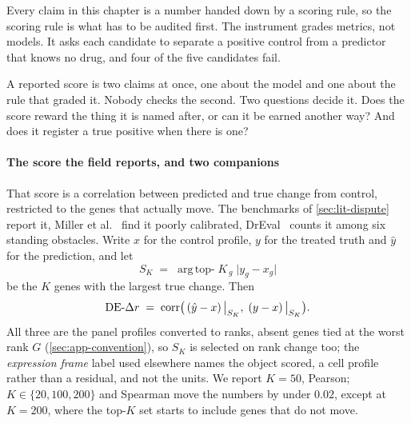 
\label{sec:methods-metrics}   %


\begin{question}[1]
Every claim in this chapter is a number handed down by a scoring rule, so the
scoring rule is what has to be audited first. The instrument grades metrics, not
models. It asks each candidate to separate a positive control from a predictor
that knows no drug, and four of the five candidates fail.
\end{question}

\noindent
A reported score is two claims at once, one about the model and one about the
rule that graded it. Nobody checks the second. Two questions decide it. Does the
score reward the thing it is named after, or can it be earned another way? And
does it register a true positive when there is one?

\paragraph{The score the field reports, and two companions} That score is a correlation between
predicted and true change from control, restricted to the genes that actually
move. The benchmarks of \cref{sec:lit-dispute} report it,
Miller et al.~\cite{miller} find it poorly calibrated, DrEval~\cite{dreval}
counts it among six standing obstacles. Write $x$ for the control profile, $y$
for the treated truth and $\hat y$ for the
prediction, and let
\begin{equation}
 S_K \;=\; \operatorname*{arg\,top-}K_{\,g} \; \lvert y_g - x_g \rvert
\end{equation}
be the $K$ genes with the largest true change. Then
\begin{equation}
 \textrm{DE-}\Delta r \;=\; \operatorname{corr}\!\big( \left(\hat{y} - x\right)\big|_{S_K}, \;
 \left(y - x\right)\big|_{S_K} \big).
\end{equation}
All three are the panel profiles converted to ranks, absent genes tied at the
worst rank $G$ (\cref{sec:app-convention}), so $S_K$ is selected on rank change
too; the \emph{expression frame} label used elsewhere names the object scored, a
cell profile rather than a residual, and not the units. We report $K = 50$,
Pearson; $K \in \{20, 100, 200\}$ and Spearman move the
numbers by under $0.02$, except at $K = 200$, where the top-$K$ set starts to
include genes that do not move.

